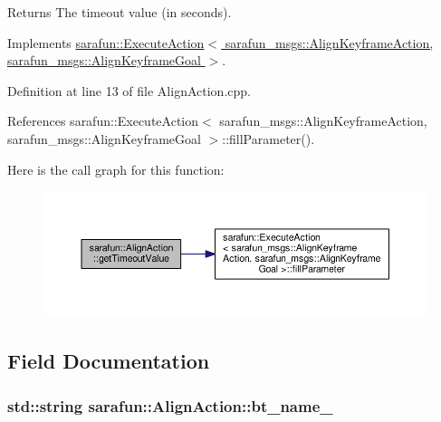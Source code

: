 \begin{DoxyReturn}{Returns}
The timeout value (in seconds). 
\end{DoxyReturn}


Implements \hyperlink{classsarafun_1_1ExecuteAction_aba6cfa8a8ce19e735eb6394424df6d17_aba6cfa8a8ce19e735eb6394424df6d17}{sarafun\-::\-Execute\-Action$<$ sarafun\-\_\-msgs\-::\-Align\-Keyframe\-Action, sarafun\-\_\-msgs\-::\-Align\-Keyframe\-Goal $>$}.



Definition at line 13 of file Align\-Action.\-cpp.



References sarafun\-::\-Execute\-Action$<$ sarafun\-\_\-msgs\-::\-Align\-Keyframe\-Action, sarafun\-\_\-msgs\-::\-Align\-Keyframe\-Goal $>$\-::fill\-Parameter().



Here is the call graph for this function\-:\nopagebreak
\begin{figure}[H]
\begin{center}
\leavevmode
\includegraphics[width=350pt]{dc/df5/classsarafun_1_1AlignAction_a9b9741ec3203bdc1b2e7b7cecc96e6ed_a9b9741ec3203bdc1b2e7b7cecc96e6ed_cgraph}
\end{center}
\end{figure}




\subsection{Field Documentation}
\hypertarget{classsarafun_1_1AlignAction_a832ecc3a169caf20ce7cb6f45d1551e3_a832ecc3a169caf20ce7cb6f45d1551e3}{
\subsubsection[{bt\-\_\-name\-\_\-}]{\setlength{\rightskip}{0pt plus 5cm}std\-::string sarafun\-::\-Align\-Action\-::bt\-\_\-name\-\_\-\hspace{0.3cm}{\ttfamily [private]}}}\label{classsarafun_1_1AlignAction_a832ecc3a169caf20ce7cb6f45d1551e3_a832ecc3a169caf20ce7cb6f45d1551e3}


